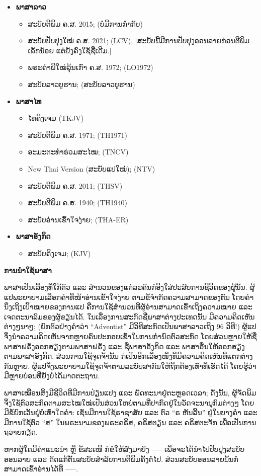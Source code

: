 \begin{itemize}
  \item \textbf{ພາສາລາວ}
  \begin{itemize}
    \item ສະບັບຕີພິມ ຄ.ສ. 2015; (ບໍ່ມີການກຳກັບ)
    \item ສະບັບປັບປຸງໃໝ່ ຄ.ສ. 2021; (LCV), [ສະບັບນີ້ມີການປັບປຸງອອນລາຍກ່ອນຕີພິມເລັກນ້ອຍ ແຕ່ຍັງຄົງໃຊ້ຊື່ເດີມ.]
    \item ພຣະຄຳພີໃໝ່ລຸ້ນເກົ່າ ຄ.ສ. 1972; (LO1972)
    \item ສະບັບລາວບູຮານ; (ສະບັບລາວບູຮານ)
  \end{itemize}

  \item \textbf{ພາສາໄທ}
  \begin{itemize}
    \item ໄທຄິງເຈມ (TKJV)
    \item ສະບັບຕີພິມ ຄ.ສ. 1971; (TH1971)
    \item ອະມະຕະທຳຮ່ວມສະໄໝ; (TNCV)
    \item New Thai Version (ສະບັບແປໃໝ່); (NTV)
    \item ສະບັບຕີພິມ ຄ.ສ. 2011; (THSV)
    \item ສະບັບຕີພິມ ຄ.ສ. 1940; (TH1940)
    \item ສະບັບອ່ານເຂົ້າໃຈງ່າຍ; (THA-ER)
  \end{itemize}
  
  \item  \textbf{ພາສາອັງກິດ}
  \begin{itemize}
    \item ສະບັບຄິງເຈມ; (KJV)
  \end{itemize}
\end{itemize}

\textbf{ການນຳໃຊ້ພາສາ}

ພາສາເປັນເລື່ອງທີ່ໃກ້ຕົວ ແລະ ສຳນວນຂອງແຕ່ລະຄົນກໍອີງໃສ່ປະສົບການຊີວິດຂອງຜູ້ນັ້ນ. ຜູ້ແປພະຍາຍາມເລືອກຄຳທີ່ໜ້າອ່ານເຂົ້າໃຈງ່າຍ ຕາມຂໍ້ຈຳກັດຄວາມສາມາດຂອງຕົນ ໂດຍຄຳນຶງເຖິງເປົ້າໝາຍຂອງການແປ ຄືການໃຊ້ສຳນວນທີ່ຜູ້ອ່ານສາມາດເຂົ້າເຖິງຄວາມໝາຍ ແລະ ເຈດຕະນາລົມຂອງຜູ້ຂຽນໄດ້. ໃນເລື່ອງການສະກົດຊື່ພາສາຕ່າງປະເທດນັ້ນ ມີຄວາມຄິດເຫັນຕ່າງໆນາໆ; (ຍົກຕົວຢ່າງຄຳວ່າ “Adventist” ມີວິທີສະກົດເປັນພາສາລາວເຖິງ 96 ວິທີ!) ຜູ້ແປຈຶ່ງນຳຄວາມຄິດເຫັນຈາກຫຼາຍຄົນປະກອບເຂົ້າໃນການກຳນົດຕົວສະກົດ ໂດຍສ່ວນຫຼາຍໃຫ້ຊື່ພາສາຝຣັ່ງອອກສຽງຕາມພາສາຝຣັ່ງ ແລະ ຊື່ພາສາອັງກິດ ແລະ ພາສາອື່ນໃຫ້ອອກສຽງຕາມພາສາອັງກິດ. ສ່ວນການໃຊ້ຈຸດຈ້ຳນັ້ນ ກໍເປັນອີກເລື່ອງໜຶ່ງທີ່ມີຄວາມຄິດເຫັນທີ່ແຕກຕ່າງກັນຫຼາຍ. ຜູ້ແປຈຶ່ງພະຍາຍາມໃຊ້ຈຸດຈ້ຳຕາມລະບົບສາກົນໃຫ້ຖືກຕ້ອງເທົ່າທີ່ເຮັດໄດ້ ໂດຍຮູ້ວ່າ ມີຫຼາຍບ່ອນທີ່ຍັງບໍ່ໄດ້ມາດຕະຖານ.

ພາສາເໝືອນສິ່ງມີຊີວິດທີ່ມີການປ່ຽນແປງ ແລະ ພັດທະນາຢູ່ຕະຫຼອດເວລາ; ດັ່ງນັ້ນ, ຜູ້ຈັດພິມຈຶ່ງໃຊ້ຕົວສະກົດຕາມສະໄໝໃໝ່ເປັນສ່ວນໃຫຍ່ຕາມທີ່ປາກົດຢູ່ໃນວັດຈະນານຸກົມຕ່າງໆ ໂດຍມີຂໍ້ຍົກເວັ້ນຢູ່ບໍ່ເທົ່າໃດຄຳ: ເຊັ່ນມີການໃຊ້ຣາຊາສັບ ແລະ ຕົວ “ຣ ຫັນລີ້ນ” ຢູ່ໃນບາງຄຳ ແລະ ມີການໃຊ້ຕົວ “ສ” ໃນພຣະນາມຂອງພຣະຄຣິສ, ຄຣິສຕຽນ ແລະ ຄຣິສຕະຈັກ ເພື່ອເປັນການຖວາຍກຽດ.

ຫາກຜູ້ໃດມີຄຳແນະນຳ ຫຼື ຂໍ້ສະເໜີ ກໍຂໍໃຫ້ສົ່ງມາຍັງ ----- ເພື່ອຈະໄດ້ນຳໄປປັບປຸງສະບັບອອນລາຍ ແລະ ດັດແກ້ຕົ້ນສະບັບສຳລັບການຕີພິມຄັ້ງຕໍ່ໄປ. ສ່ວນສະບັບອອນລາຍນັ້ນກໍສາມາດເຂົ້າອ່ານໄດ້ທີ່ -----.
